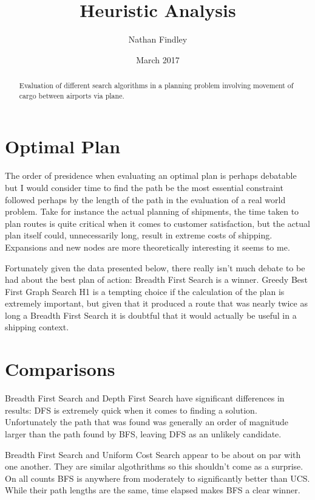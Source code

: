 \documentclass[10pt, a4paper]{article}
\title{Heuristic Analysis}
\author{Nathan Findley}
\date{March 2017}
\begin{document}
\maketitle
\tableofcontents

\begin{abstract}
	Evaluation of different search algorithms in a planning problem involving movement of cargo
	between airports via plane.
\end{abstract}

\section{Optimal Plan}

The order of presidence when evaluating an optimal plan is perhaps debatable
but I would consider time to find the path be the most essential constraint followed
perhaps by the length of the path in the evaluation of a real world problem.  Take for
instance the actual planning of shipments, the time taken to plan routes is quite critical
when it comes to customer satisfaction, but the actual plan itself could, unnecessarily long,
result in extreme costs of shipping.  Expansions and new nodes are more theoretically interesting
it seems to me.

Fortunately given the data presented below, there really isn't much debate to be had about the
best plan of action: Breadth First Search is a winner.  Greedy Best First Graph Search H1 is a
tempting choice if the calculation of the plan is extremely important, but given that it produced
a route that was nearly twice as long a Breadth First Search it is doubtful that it would actually
be useful in a shipping context.

\section{Comparisons}

Breadth First Search and Depth First Search have significant differences in results: DFS is extremely quick when it comes to finding a solution.  Unfortunately
the path that was found was generally an order of magnitude larger than the path found by BFS, leaving DFS as an unlikely candidate.

Breadth First Search and Uniform Cost Search appear to be about on par with one another.  They are similar algothrithms so this shouldn't come as a surprise.
On all counts BFS is anywhere from moderately to significantly better than UCS.  While their path lengths are the same, time elapsed makes BFS a clear winner.
\end{document}
